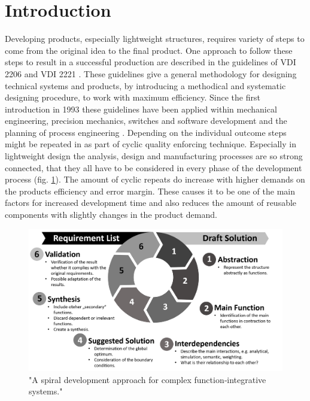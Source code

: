\section{\label{sec:SoA}Introduction}
Developing products, especially lightweight structures, 
requires variety of steps to come from the original idea to the final product.
One approach to follow these steps to result in a successful production 
are described in the guidelines of VDI 2206 \cite{gausmeier2002} and VDI 2221 \cite{Jansch2006THEDO}.
These guidelines give a general methodology for designing technical systems and products, 
by introducing a methodical and systematic designing procedure, to work with maximum efficiency.
Since the first introduction in 1993 these guidelines have been applied within mechanical engineering, precision mechanics, 
switches and software development and the planning of process engineering \cite{pahl_beitz_2013}. 
Depending on the individual outcome steps might be repeated in as part of cyclic quality enforcing technique.
Especially in lightweight design the analysis, design and manufacturing processes are so strong connected, 
that they all have to be considered in every phase of the development process (fig. \ref{pic:interactive-design}).
The amount of cyclic repeats do increase with higher demands on the products efficiency and error margin.
These causes it to be one of the main factors for increased development time and 
also reduces the amount of reusable components with slightly changes in the product demand.\\
\begin{figure}[h]
    \centering
    \includegraphics[scale=0.4]{pics/interactive-design.PNG}
    \caption{\label{pic:interactive-design} "A spiral development approach for complex function‐integrative systems." \cite{Modler2020}}
\end{figure}\\
